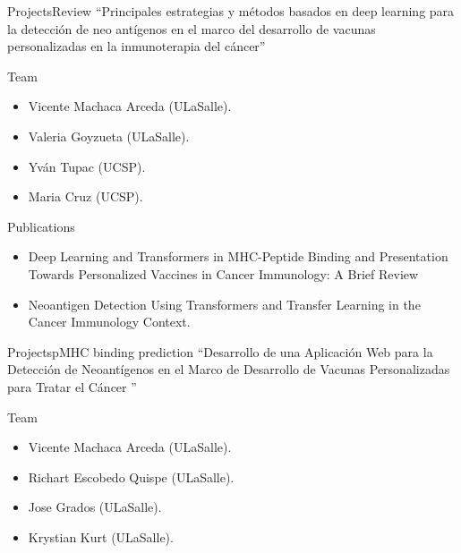 \documentclass[10pt]{beamer}
\newcommand{\1}{
	\setbeamertemplate{background}{
		\texttt{[image: ../img/1]}
		\tikz[overlay] \fill[fill opacity=0.75,fill=white] (0,0) rectangle (-\paperwidth,\paperheight);
	}
}
\begin{document}
	\begin{frame}{Projects}{Review}	
		\small
		``Principales estrategias y métodos basados en deep learning para la detección de neo antígenos en el marco del desarrollo de vacunas personalizadas en la inmunoterapia del cáncer''
		
		\begin{block}{Team}
			\begin{itemize}

					\item Vicente Machaca Arceda (ULaSalle).
					\item Valeria Goyzueta (ULaSalle).
					\item Yván Tupac (UCSP).
					\item Maria Cruz (UCSP).				

			\end{itemize}
		\end{block}
	
		\begin{block}{Publications}
			\begin{itemize}
				\item Deep Learning and Transformers in MHC-Peptide Binding and Presentation Towards Personalized Vaccines in Cancer Immunology: A Brief Review
				\item Neoantigen Detection Using Transformers and Transfer Learning in the Cancer Immunology Context.				
			\end{itemize}
		\end{block}
	\end{frame}
	
	\begin{frame}{Projects}{pMHC binding prediction}	
		\small
		``Desarrollo de una Aplicación Web para la Detección de Neoantígenos en el Marco de Desarrollo de Vacunas Personalizadas para Tratar el Cáncer   ''
		
		\begin{block}{Team}
			\begin{itemize}
				
				\item Vicente Machaca Arceda (ULaSalle).
				\item Richart Escobedo Quispe (ULaSalle).
				\item Jose Grados (ULaSalle).
				\item Krystian Kurt (ULaSalle).				
				
			\end{itemize}
		\end{block}
		
		
	\end{frame}
\end{document}
